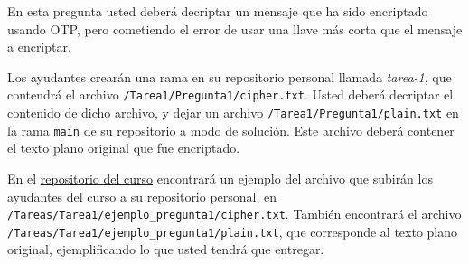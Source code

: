 
En esta pregunta usted deberá decriptar un mensaje que ha sido encriptado usando OTP, pero cometiendo el error de usar una llave más corta que el mensaje a encriptar.

Los ayudantes crearán una rama en su repositorio personal llamada \emph{tarea-1}, que contendrá el archivo \texttt{/Tarea1/Pregunta1/cipher.txt}. Usted deberá decriptar el contenido de dicho archivo, y dejar un archivo \texttt{/Tarea1/Pregunta1/plain.txt} en la rama \texttt{main} de su repositorio a modo de solución. Este archivo deberá contener el texto plano original que fue encriptado. 

En el \href{https://github.com/IIC3253/2025}{repositorio del curso} encontrará un ejemplo del archivo que subirán los ayudantes del curso a su repositorio personal, en \texttt{/Tareas/Tarea1/ejemplo\_pregunta1/cipher.txt}. También encontrará el archivo \texttt{/Tareas/Tarea1/ejemplo\_pregunta1/plain.txt}, que corresponde al texto plano original, ejemplificando lo que usted tendrá que entregar.

